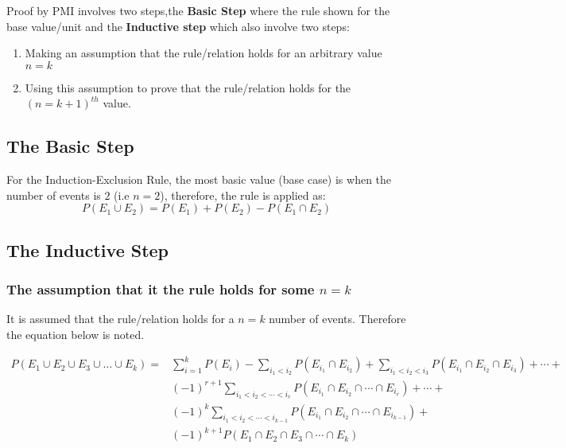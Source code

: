 \documentclass[a4paper]{article}
\begin{document}
    Proof by PMI involves two steps,the \textbf{Basic Step} where the rule shown for the base value/unit and the \textbf{Inductive step} which also involve two steps:
    \begin{enumerate}
        \item {Making an assumption that the rule/relation holds for an arbitrary value $n = k$}
        \item {Using this assumption to prove that the rule/relation holds for the ${(n = k + 1)}^{th}$ value.}
    \end{enumerate}

    \subsection{The Basic Step}
    For the Induction-Exclusion Rule, the most basic value (base case) is when the number of events is $2$ (i.e $n = 2$), therefore, the rule is applied as:
    \begin{equation} \label{base_case}
        P(E_1 \cup E_2) = P(E_1) + P(E_2) - P(E_1 \cap E_2)
    \end{equation}
    \subsection{The Inductive Step}
    \subsubsection*{The assumption that it the rule holds for some $n = k$}
    It is assumed that the rule/relation holds for a $n = k$ number of events. Therefore the equation below is noted.

    \begin{equation} \label{kth_rule}
        \begin{split}
            P(E_1 \cup E_2 \cup E_3 \cup \dots \cup E_k) = & \sum_{i = 1}^{k} P(E_i) - \sum_{i_1 < i_2} P(E_{i_1} \cap E_{i_2}) + \sum_{i_1 < i_2 < i_3} P(E_{i_1} \cap E_{i_2} \cap E_{i_3}) + \cdots + \\
            & {(-1)}^{r + 1} \sum_{i_1 < i_2 < \cdots < i_r} P(E_{i_1} \cap E_{i_2} \cap \cdots \cap E_{i_r}) + \cdots + \\
            & {(-1)}^{k} \sum_{i_1 < i_2 < \cdots < i_{k-1}} P(E_{i_1} \cap E_{i_2} \cap \cdots \cap E_{i_{k-1}}) + \\
            & {(-1)}^{k + 1} P(E_1 \cap E_2 \cap E_3 \cap \cdots \cap E_k)
        \end{split}
    \end{equation}
\end{document}

